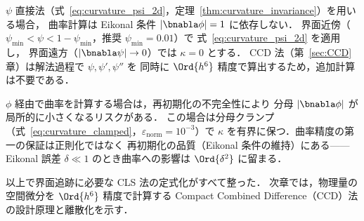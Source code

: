 $\psi$ 直接法（式~\eqref{eq:curvature_psi_2d}，定理~\ref{thm:curvature_invariance}）を用いる場合，
曲率計算は Eikonal 条件 $|\bnabla\phi|=1$ に依存しない．
界面近傍（$\psi_{\min} < \psi < 1-\psi_{\min}$，推奨 $\psi_{\min}=0.01$）で
式~\eqref{eq:curvature_psi_2d} を適用し，
界面遠方（$|\bnabla\psi| \to 0$）では $\kappa = 0$ とする．
CCD 法（第~\ref{sec:CCD}章）は解法過程で $\psi, \psi', \psi''$ を
同時に $\Ord{h^6}$ 精度で算出するため，追加計算は不要である．

$\phi$ 経由で曲率を計算する場合は，再初期化の不完全性により
分母 $|\bnabla\phi|$ が局所的に小さくなるリスクがある．
この場合は分母クランプ（式~\eqref{eq:curvature_clamped}，$\varepsilon_{\text{norm}} = 10^{-3}$）で
$\kappa$ を有界に保つ．曲率精度の第一の保証は正則化ではなく
再初期化の品質（Eikonal 条件の維持）にある——
Eikonal 誤差 $\delta \ll 1$ のとき曲率への影響は $\Ord{\delta^2}$ に留まる．

\medskip
以上で界面追跡に必要な CLS 法の定式化がすべて整った．
次章では，物理量の空間微分を $\Ord{h^6}$ 精度で計算する
Compact Combined Difference（CCD）法の設計原理と離散化を示す．
